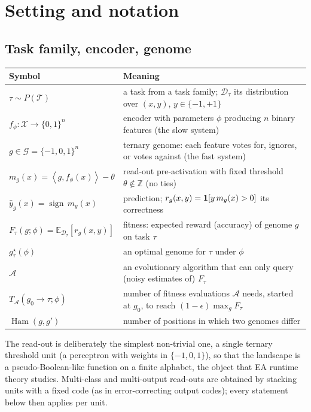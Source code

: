 \documentclass[11pt,a4paper]{article}
\theoremstyle{definition}
\theoremstyle{plain}
\theoremstyle{remark}
\newcommand{\E}{\mathbb{E}}
\newcommand{\ind}[1]{\one\!\left[#1\right]}
\newcommand{\Dist}{\mathcal{D}}
\newcommand{\Gen}{\mathcal{G}}          %
\newcommand{\ip}[2]{\left\langle #1, #2 \right\rangle}
\newcommand{\Ham}{\operatorname{Ham}}
\newcommand{\fast}[1]{\textcolor{fast}{#1}}
\newcommand{\slowc}[1]{\textcolor{slow}{#1}}
\newcommand{\Task}{\mathcal{T}}
\newcommand{\sign}{\operatorname{sign}}
\begin{document}
\section{Setting and notation}
\label{sec:setting}

\subsection{Task family, encoder, genome}

\begin{center}
\small
\begin{tabularx}{\linewidth}{@{}lY@{}}
\toprule
\textbf{Symbol} & \textbf{Meaning} \\
\midrule
$\tau\sim P(\Task)$ & a task from a task family; $\Dist_\tau$ its distribution over $(x,y)$, $y\in\{-1,+1\}$ \\
$f_\phi:\mathcal{X}\to\{0,1\}^n$ & encoder with parameters $\phi$ producing $n$ binary features (the \slowc{slow} system) \\
$g\in\Gen=\{-1,0,1\}^n$ & ternary genome: each feature votes for, ignores, or votes against (the \fast{fast} system) \\
$m_g(x) = \ip{g}{f_\phi(x)} - \theta$ & read-out pre-activation with fixed threshold $\theta\notin\mathbb{Z}$ (no ties) \\
$\hat y_g(x) = \sign\, m_g(x)$ & prediction; $r_g(x,y) = \ind{y\, m_g(x) > 0}$ its correctness \\
$F_\tau(g;\phi) = \E_{\Dist_\tau}[r_g(x,y)]$ & fitness: expected reward (accuracy) of genome $g$ on task $\tau$ \\
$g^\star_\tau(\phi)$ & an optimal genome for $\tau$ under $\phi$ \\
$\mathcal{A}$ & an evolutionary algorithm that can only query (noisy estimates of) $F_\tau$ \\
$T_\mathcal{A}(g_0\to\tau;\phi)$ & number of fitness evaluations $\mathcal{A}$ needs, started at $g_0$, to reach $(1-\epsilon)\max_g F_\tau$ \\
$\Ham(g,g')$ & number of positions in which two genomes differ \\
\bottomrule
\end{tabularx}
\end{center}

The read-out is deliberately the simplest non-trivial one, a single ternary threshold unit (a perceptron with weights in $\{-1,0,1\}$), so that the landscape is a pseudo-Boolean-like function on a finite alphabet, the object that EA runtime theory studies. Multi-class and multi-output read-outs are obtained by stacking units with a fixed code (as in error-correcting output codes); every statement below then applies per unit.
\end{document}
